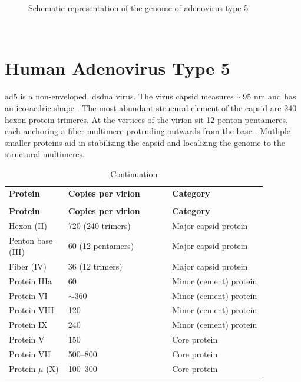 \begin{figure}[ht]
\caption{Schematic representation of the genome of adenovirus type 5}
\end{figure}\

\section{Human Adenovirus Type 5}

\ac{ad5} is a non-enveloped, \ac{dsdna} virus. The virus capsid measures $\sim$95 nm and has an icosaedric shape \cite{fabryQuasiatomicModelHuman2005}. The most abundant strucural element of the capsid are 240 hexon protein trimeres. At the vertices of the virion sit 12 penton pentameres, each anchoring a fiber multimere protruding outwards from the base \cite{liuModelTrimericFiber2011}. Mutliple smaller proteins aid in stabilizing the capsid and localizing the genome to the structural multimeres.



\begin{longtable}{L{0.2\linewidth} R{0.35\linewidth} L{0.32\linewidth}}
\caption{Structural proteins of human adenovirus type 5 }
\label{tab:ad5-structural-proteins}
\\
\toprule
\textbf{Protein} & \textbf{Copies per virion \cite{daiAtomicStructuresMinor2017}} & \textbf{Category}\\
\midrule
\endfirsthead
{}
\caption[]{Continuation}
\\
\toprule
\textbf{Protein} & \textbf{Copies per virion} & \textbf{Category}\\
\midrule
\endhead
\bottomrule
\endfoot
Hexon (II)         & 720 (240 trimers)   & Major capsid protein\\
Penton base (III)  & 60 (12 pentamers)   & Major capsid protein\\
Fiber (IV)         & 36 (12 trimers)     & Major capsid protein\\
Protein IIIa       & 60                  & Minor (cement) protein\\
Protein VI         & $\sim$360           & Minor (cement) protein\\
Protein VIII       & 120                 & Minor (cement) protein\\
Protein IX         & 240                 & Minor (cement) protein\\
Protein V          & 150                 & Core protein\\
Protein VII        & 500--800            & Core protein\\
Protein $\mu$ (X)  & 100--300            & Core protein\\
\end{longtable}

